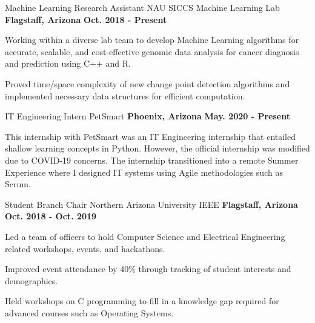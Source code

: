 

\begin{cventries}

  \cventry
    {Machine Learning Research Assistant} %
    {NAU SICCS Machine Learning Lab} %
    {\textbf{Flagstaff, Arizona}} %
    {\textbf{Oct. 2018 - Present}} %
    {
      \begin{cvitems} %
        \item {Working within a diverse lab team to develop Machine Learning algorithms for accurate, scalable, and cost-effective genomic data analysis for cancer diagnosis and prediction using C++ and R.}
        \item {Proved time/space complexity of new change point detection algorithms and implemented necessary data structures for efficient computation.}
      \end{cvitems}
    }

  \cventry
    {IT Engineering Intern} %
    {PetSmart} %
    {\textbf{Phoenix, Arizona}} %
    {\textbf{May. 2020 - Present}} %
    {
      \begin{cvitems} %
        \item {This internship with PetSmart was an IT Engineering internship that entailed shallow learning concepts in Python. However, the official internship was modified due to COVID-19 concerns. The internship transitioned into a remote Summer Experience where I designed IT systems using Agile methodologies such as Scrum.}
        {}
      \end{cvitems}
    }

  \cventry
    {Student Branch Chair} %
    {Northern Arizona University IEEE} %
    {\textbf{Flagstaff, Arizona}} %
    {\textbf{Oct. 2018 - Oct. 2019}} %
    {
      \begin{cvitems} %
        \item {Led a team of officers to hold Computer Science and Electrical Engineering related workshops, events, and hackathons.}
        \item {Improved event attendance by 40\% through tracking of student interests and demographics.}
        \item {Held workshops on C programming to fill in a knowledge gap required for advanced courses such as Operating Systems.}
      \end{cvitems}
    }


\end{cventries}
